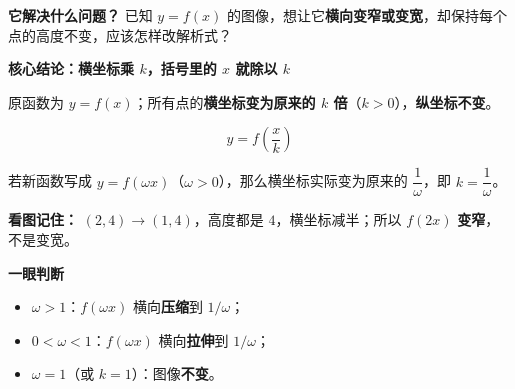 \begin{statementbox}
  \textbf{\textcolor{CStatement}{它解决什么问题？}}
  已知 $y=f(x)$ 的图像，想让它\textbf{横向变窄或变宽}，却保持每个点的高度不变，应该怎样改解析式？

  \medskip
  \textbf{\textcolor{CStatement}{核心结论：横坐标乘 $k$，括号里的 $x$ 就除以 $k$}}
  \begin{description}[style=nextline, leftmargin=2.8em, labelsep=0.5em, itemsep=0.4em]
    \item[\textbf{条件：}] 原函数为 $y=f(x)$；所有点的\textbf{横坐标变为原来的 $k$ 倍}（$k>0$），\textbf{纵坐标不变}。
    \item[\textbf{新解析式：}]
      \[
        \boxed{\ y=f\!\left(\frac{x}{k}\right)\ }
      \]
    \item[\textbf{另一种写法：}] 若新函数写成 $y=f(\omega x)$（$\omega>0$），那么横坐标实际变为原来的 $\dfrac{1}{\omega}$，即 $k=\dfrac{1}{\omega}$。
  \end{description}

  \begin{center}
  
  \end{center}
  \noindent\textbf{看图记住：} $(2,4)\to(1,4)$，高度都是 $4$，横坐标减半；所以 $f(2x)$ \textbf{变窄}，不是变宽。

  \medskip
  \textbf{\textcolor{CStatement}{一眼判断}}
  \begin{itemize}[leftmargin=*,itemsep=0.2em,topsep=0.2em]
    \item $\omega>1$：$f(\omega x)$ 横向\textbf{压缩}到 $1/\omega$；
    \item $0<\omega<1$：$f(\omega x)$ 横向\textbf{拉伸}到 $1/\omega$；
    \item $\omega=1$（或 $k=1$）：图像\textbf{不变}。
  \end{itemize}
\end{statementbox}
